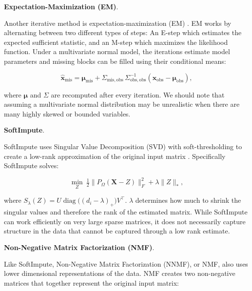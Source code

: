 \par\medskip
\noindent\textbf{Expectation-Maximization (EM)}.\par\nobreak

Another iterative method is expectation-maximization (EM) \parencite{dempster1977maximum}. EM works by alternating between two different types of steps: An E-step which estimates the expected sufficient statistic, and an M-step which maximizes the likelihood function. Under a multivariate normal model, the iterations estimate model parameters and missing blocks can be filled using their conditional means:

\begin{equation}\label{eq:em}
\hat{\mathbf{x}}_{\mathrm{mis}}=\boldsymbol\mu_{\mathrm{mis}}+\Sigma_{\mathrm{mis},\mathrm{obs}}\,\Sigma_{\mathrm{obs},\mathrm{obs}}^{-1}\!\left(\mathbf{x}_{\mathrm{obs}}-\boldsymbol\mu_{\mathrm{obs}}\right),
\end{equation}

where \(\boldsymbol\mu\) and \(\Sigma\) are recomputed after every iteration. We should note that assuming a multivariate normal distribution may be unrealistic when there are many highly skewed or bounded variables.

\par\medskip
\noindent\textbf{SoftImpute}.\par\nobreak

SoftImpute uses Singular Value Decomposition (SVD) with soft-thresholding to create a low-rank approximation of the original input matrix \parencite{mazumder2010spectral}. Specifically SoftImpute solves:

\begin{equation}\label{eq:softimpute}
\min_{Z}\ \tfrac12\bigl\lVert P_\Omega(\mathbf{X}-Z)\bigr\rVert_F^2+\lambda\lVert Z\rVert_*,
\end{equation}

where \(S_\lambda(Z)=U\operatorname{diag}\bigl((d_i-\lambda)_+\bigr)V^\top\). \(\lambda\) determines how much to shrink the singular values and therefore the rank of the estimated matrix. While SoftImpute can work efficiently on very large sparse matrices, it does not necessarily capture structure in the data that cannot be captured through a low rank estimate.

\par\medskip
\noindent\textbf{Non-Negative Matrix Factorization (NMF)}.\par\nobreak

Like SoftImpute, Non-Negative Matrix Factorization (NNMF), or NMF, also uses lower dimensional representations of the data. NMF creates two non-negative matrices \parencite{lee1999learning} that together represent the original input matrix:

